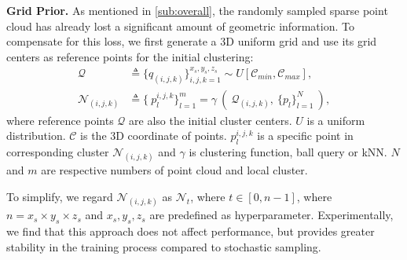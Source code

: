 \noindent \textbf{Grid Prior.}
As mentioned in \cref{sub:overall}, the randomly sampled sparse point cloud has already lost a significant amount of geometric information. To compensate for this loss, we first generate a 3D uniform grid and use its grid centers as reference points for the initial clustering:
\begin{equation}\label{eq:grid}
    \begin{aligned}
        \mathcal{Q}\  &\triangleq \{q_{(i,j,k)}\}_{i,j,k=1}^{x_s,y_s,z_s} \sim U[\mathcal{C}_{min},\mathcal{C}_{max}], \\
        \mathcal{N}_{(i,j,k)} &\triangleq \{\ p_l^{i,j,k}\}_{l=1}^{m} = \gamma\ (\ \mathcal{Q}_{(i,j,k)},\ \{p_l\}_{l=1}^N\ ),
\end{aligned}
\end{equation}
where reference points $\mathcal{Q}$ are also the initial cluster centers. $U$ is a uniform distribution. $\mathcal{C}$ is the 3D coordinate of points. $p_l^{i,j,k}$ is a specific point in corresponding cluster $\mathcal{N}_{(i,j,k)}$ and $\gamma$ is clustering function, \eg ball query or kNN. $N$ and $m$ are respective numbers of point cloud and local cluster.

To simplify, we regard $\mathcal{N}_{(i,j,k)}$ as $\mathcal{N}_t$, where $t \in [0, n-1]$, where $n=x_s \times y_s \times z_s$ and $x_s,y_s,z_s$ are predefined as hyperparameter. Experimentally, we find that this approach does not affect performance, but provides greater stability in the training process compared to stochastic sampling.

